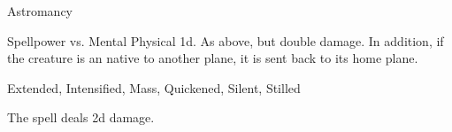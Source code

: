 \begin{spellsection}{Astromancy}
\begin{spellheader}
\end{spellheader}
\begin{spellcontent}
\begin{spelltargetinginfo}
\end{spelltargetinginfo}
\begin{spelleffects}
\begin{spellattack}{Spellpower vs. Mental}
\spellsuccess Physical  \plus1d.
\spellcritical
As above, but double damage.
In addition, if the creature is an  native to another plane, it is sent back to its home plane.
\end{spellattack}
\end{spelleffects}
\end{spellcontent}
\begin{spellfooter}
 Extended, Intensified, Mass, Quickened, Silent, Stilled
\end{spellfooter}
\begin{spellsubcontent}
\begin{spellcantrip}
The spell deals \minus2d damage.
\end{spellcantrip}
\end{spellsubcontent}
\end{spellsection}
